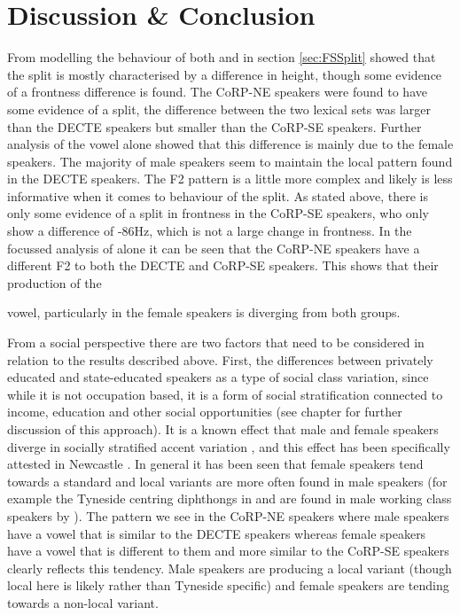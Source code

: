 \documentclass[../../../00.FullDoc/tex/ThesisSkeleton-draft2]{subfiles}
\begin{document}
\begin{figure}[h]
	
	\caption{} \label{fig:strutF2-sex}
\end{figure}

\section{Discussion \& Conclusion}
From modelling the behaviour of both \foot{} and \strutt{} in section \ref{sec:FSSplit} showed that the \FS{} split is mostly characterised by a difference in height, though some evidence of a frontness difference is found. The CoRP-NE speakers were found to have some evidence of a \FS{} split, the difference between the two lexical sets was larger than the DECTE speakers but smaller than the CoRP-SE speakers. Further analysis of the \strutt{} vowel alone showed that this difference is mainly due to the female speakers. The majority of male speakers seem to maintain the local pattern found in the DECTE speakers. The F2 pattern is a little more complex and likely is less informative when it comes to behaviour of the \FS{} split. As stated above, there is only some evidence of a split in frontness in the CoRP-SE speakers, who only show a difference of -86Hz, which is not a large change in frontness. In the focussed analysis of \strutt{} alone it can be seen that the CoRP-NE speakers have a different F2 to both the DECTE and CoRP-SE speakers. This shows that their production of the \strut{} vowel, particularly in the female speakers is diverging from both groups.

From a social perspective there are two factors that need to be considered in relation to the results described above.
First, the differences between privately educated and state-educated speakers as a type of social class variation, since while it is not occupation based, it is a form of social stratification connected to income, education and other social opportunities (see chapter \notinsubfile{\ref{ch:LitReviewSocio}} for further discussion of this approach). It is a known effect that male and female speakers diverge in socially stratified accent variation \citep{Labov2001b}, and this effect has been specifically attested in Newcastle \citep{Watt1998}. In general it has been seen that female speakers tend towards a standard and local variants are more often found in male speakers (for example the Tyneside centring diphthongs in \goat{} and  are found in male working class speakers by \cite{Watt1998}). The pattern we see in the CoRP-NE speakers where male speakers have a \strutt{} vowel that is similar to the DECTE speakers whereas female speakers have a \strutt{} vowel that is different to them and more similar to the CoRP-SE speakers clearly reflects this tendency. Male speakers are producing a local variant (though local here is likely  rather than Tyneside specific) and female speakers are tending towards a non-local variant.
\end{document}
